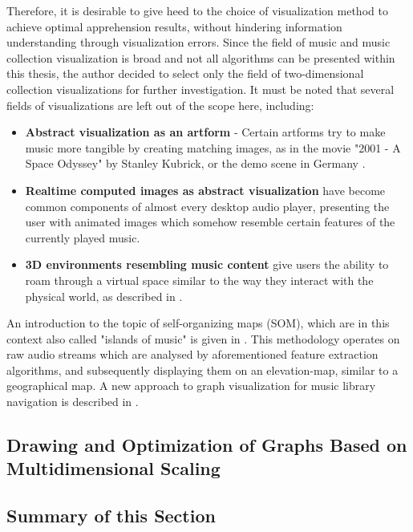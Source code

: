 Therefore, it is desirable to give heed to the choice of visualization method to achieve optimal apprehension results, without hindering information understanding through visualization errors.
Since the field of music and music collection visualization is broad and not all algorithms can be presented within this thesis, the author decided to select only the field of two-dimensional collection visualizations for further investigation. It must be noted that several fields of visualizations are left out of the scope here, including:

\begin{itemize}
	\item \textbf{Abstract visualization as an artform} - Certain artforms try to make music more tangible by creating matching images, as in the movie "2001 - A Space Odyssey" by Stanley Kubrick, or the demo scene in Germany \cite{Scheib:2002}.
	\item \textbf{Realtime computed images as abstract visualization} have become common components of almost every desktop audio player, presenting the user with animated images which somehow resemble certain features of the currently played music.
	\item \textbf{3D environments resembling music content} give users the ability to roam through a virtual space similar to the way they interact with the physical world, as described in \cite{Dittenbach:2007}.
\end{itemize}


An introduction to the topic of self-organizing maps (SOM), which are in this context also called "islands of music" is given in \cite{Cooper:2006:VAM}. This methodology operates on raw audio streams which are analysed by aforementioned feature extraction algorithms, and subsequently displaying them on an elevation-map, similar to a geographical map. 
A new approach to graph visualization for music library navigation is described in \cite{Muelder:2010fk}.

\subsection{Drawing and Optimization of Graphs Based on Multidimensional Scaling}


\subsection{Summary of this Section}